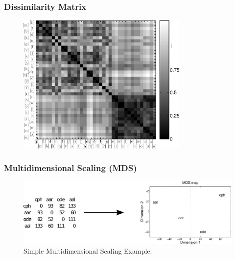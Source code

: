 \documentclass{beamer}
\begin{document}
\frame
{
  \frametitle{Dissimilarity Matrix}
  \vspace{-0.25cm}
  \begin{figure}[h]
  \centering
  \includegraphics[width=0.75\textwidth]{imagespresentation/dissimilarity_en_matrix.png}
  \end{figure}
}

\frame
{
  \frametitle{Multidimensional Scaling (MDS)}
  \begin{figure}[h]
  \centering
  \includegraphics[width=\textwidth]{imagespresentation/mdsex.pdf}
  \caption{Simple Multidimensional Scaling Example.}
  \end{figure}
}
\end{document}
